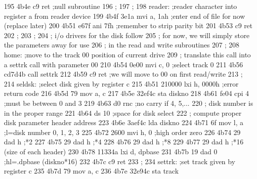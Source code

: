 195      4b4e c9                   ret                   ;null subroutine
196                       ;
197                       ;
198                       reader:  ;reader character into register a from reader device
199      4b4f 3e1a                 mvi    a, 1ah         ;enter end of file for now (replace later)
200      4b51 e67f                 ani    7fh            ;remember to strip parity bit
201      4b53 c9                   ret
202                       ;
203                       ;
204                       ;        i/o drivers for the disk follow
205                       ;        for now, we will simply store the parameters away for use
206                       ;        in the read and write subroutines
207                       ;
208                       home:    ;move to the track 00 position of current drive
209                       ;        translate this call into a settrk call with parameter 00
210      4b54 0e00                 mvi    c, 0           ;select track 0
211      4b56 cd7d4b               call   settrk
212      4b59 c9                   ret                   ;we will move to 00 on first read/write
213                       ;
214                       seldsk:  ;select disk given by register c
215      4b51 210000               lxi    h, 0000h       ;error return code
216      4b5d 79                   mov    a, c
217      4b5e 32ef4c               sta    diskno
218      4b61 fe04                 cpi    4              ;must be between 0 and 3
219      4b63 d0                   rnc                   ;no carry if 4, 5,...
220                       ;        disk number is in the proper range
221      4b64                      ds     10             ;space for disk select
222                       ;        compute proper disk parameter header address
223      4b6e 3aef4c               lda    diskno
224      4b71 6f                   mov    l, a           ;l=disk number 0, 1, 2, 3
225      4b72 2600                 mvi    h, 0           ;high order zero
226      4b74 29                   dad    h              ;*2
227      4b75 29                   dad    h              ;*4
228      4b76 29                   dad    h              ;*8
229      4b77 29                   dad    h              ;*16 (size of each header)
230      4b78 11334a               lxi    d, dpbase
231      4b7b 19                   dad    0              ;hl=.dpbase (diskno*16)
232      4b7c c9                   ret
233                       ;
234                       settrk:  ;set track given by register c
235      4b7d 79                   mov    a, c
236      4b7e 32e94c               sta    track
